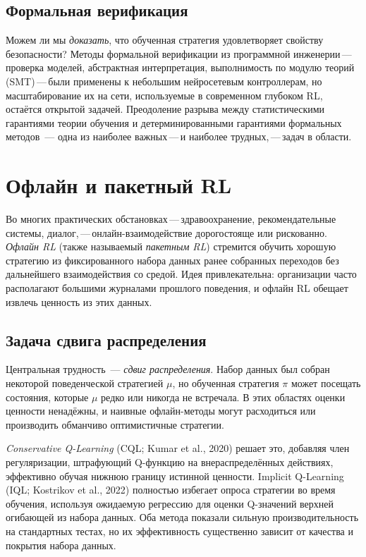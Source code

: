 \subsection{Формальная верификация}

Можем ли мы \emph{доказать}, что обученная стратегия удовлетворяет свойству безопасности?
Методы формальной верификации из программной инженерии\,---\,проверка моделей,
абстрактная интерпретация, выполнимость по модулю теорий
(SMT)\,---\,были применены к небольшим нейросетевым контроллерам, но
масштабирование их на сети, используемые в современном глубоком RL, остаётся открытой
задачей. Преодоление разрыва между статистическими гарантиями
теории обучения и детерминированными гарантиями формальных методов~---
одна из наиболее важных\,---\,и наиболее трудных,\,---\,задач в
области.


\section{Офлайн и пакетный RL}
\label{sec:open-offline}

Во многих практических обстановках\,---\,здравоохранение, рекомендательные системы,
диалог,\,---\,онлайн-взаимодействие дорогостояще или рискованно.
\emph{Офлайн RL} (также называемый \emph{пакетным RL}) стремится обучить
хорошую стратегию из фиксированного набора данных ранее собранных переходов
без дальнейшего взаимодействия со средой. Идея привлекательна:
организации часто располагают большими журналами прошлого поведения, и офлайн
RL обещает извлечь ценность из этих данных.

\subsection{Задача сдвига распределения}

Центральная трудность~--- \emph{сдвиг распределения}. Набор данных был
собран некоторой поведенческой стратегией $\mu$, но обученная стратегия
$\pi$ может посещать состояния, которые $\mu$ редко или никогда не встречала. В
этих областях оценки ценности ненадёжны, и наивные офлайн-методы
могут расходиться или производить обманчиво оптимистичные стратегии.

\emph{Conservative Q-Learning} (CQL; Kumar et al., 2020) решает это,
добавляя член регуляризации, штрафующий Q-функцию на
внераспределённых действиях, эффективно обучая нижнюю границу истинной
ценности. Implicit Q-Learning (IQL; Kostrikov et al., 2022)
полностью избегает опроса стратегии во время обучения, используя ожидаемую
регрессию для оценки Q-значений верхней огибающей из набора данных.
Оба метода показали сильную производительность на стандартных тестах,
но их эффективность существенно зависит от качества и покрытия
набора данных.

